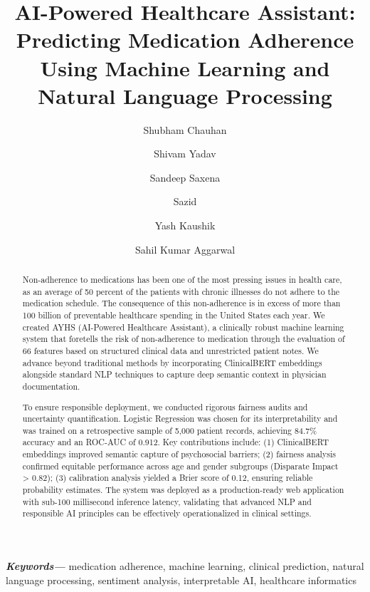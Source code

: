 \documentclass{article}
\providecommand{\keywords}[1]{\textbf{\textit{Keywords---}} #1}
\begin{document}
\title{AI-Powered Healthcare Assistant: Predicting Medication Adherence Using Machine Learning and Natural Language Processing}

\author[1]{Shubham Chauhan}
\author[1]{Shivam Yadav}
\author[1]{Sandeep Saxena}
\author[1]{Sazid}
\author[1]{Yash Kaushik}
\author[1]{Sahil Kumar Aggarwal}


\date{}

\maketitle

\begin{abstract}
Non-adherence to medications has been one of the most pressing issues in health care, as an average of 50 percent of the patients with chronic illnesses do not adhere to the medication schedule. The consequence of this non-adherence is in excess of more than 100 billion of preventable healthcare spending in the United States each year. We created AYHS (AI-Powered Healthcare Assistant), a clinically robust machine learning system that foretells the risk of non-adherence to medication through the evaluation of 66 features based on structured clinical data and unrestricted patient notes. We advance beyond traditional methods by incorporating ClinicalBERT embeddings alongside standard NLP techniques to capture deep semantic context in physician documentation.

To ensure responsible deployment, we conducted rigorous fairness audits and uncertainty quantification. Logistic Regression was chosen for its interpretability and was trained on a retrospective sample of 5,000 patient records, achieving 84.7\% accuracy and an ROC-AUC of 0.912. Key contributions include: (1) ClinicalBERT embeddings improved semantic capture of psychosocial barriers; (2) fairness analysis confirmed equitable performance across age and gender subgroups (Disparate Impact > 0.82); (3) calibration analysis yielded a Brier score of 0.12, ensuring reliable probability estimates. The system was deployed as a production-ready web application with sub-100 millisecond inference latency, validating that advanced NLP and responsible AI principles can be effectively operationalized in clinical settings.
\end{abstract}

\keywords{medication adherence, machine learning, clinical prediction, natural language processing, sentiment analysis, interpretable AI, healthcare informatics}
\end{document}
